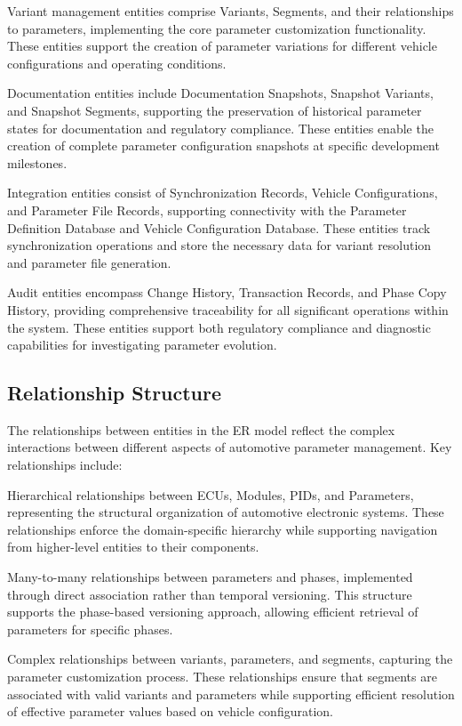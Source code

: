 Variant management entities comprise Variants, Segments, and their relationships to parameters, implementing the core parameter customization functionality. These entities support the creation of parameter variations for different vehicle configurations and operating conditions.

Documentation entities include Documentation Snapshots, Snapshot Variants, and Snapshot Segments, supporting the preservation of historical parameter states for documentation and regulatory compliance. These entities enable the creation of complete parameter configuration snapshots at specific development milestones.

Integration entities consist of Synchronization Records, Vehicle Configurations, and Parameter File Records, supporting connectivity with the Parameter Definition Database and Vehicle Configuration Database. These entities track synchronization operations and store the necessary data for variant resolution and parameter file generation.

Audit entities encompass Change History, Transaction Records, and Phase Copy History, providing comprehensive traceability for all significant operations within the system. These entities support both regulatory compliance and diagnostic capabilities for investigating parameter evolution.

\subsection{Relationship Structure}
\label{subsec:relationship-structure}

The relationships between entities in the \ac{ER} model reflect the complex interactions between different aspects of automotive parameter management. Key relationships include:

Hierarchical relationships between \acp{ECU}, Modules, \acp{PID}, and Parameters, representing the structural organization of automotive electronic systems. These relationships enforce the domain-specific hierarchy while supporting navigation from higher-level entities to their components.

Many-to-many relationships between parameters and phases, implemented through direct association rather than temporal versioning. This structure supports the phase-based versioning approach, allowing efficient retrieval of parameters for specific phases.

Complex relationships between variants, parameters, and segments, capturing the parameter customization process. These relationships ensure that segments are associated with valid variants and parameters while supporting efficient resolution of effective parameter values based on vehicle configuration.

